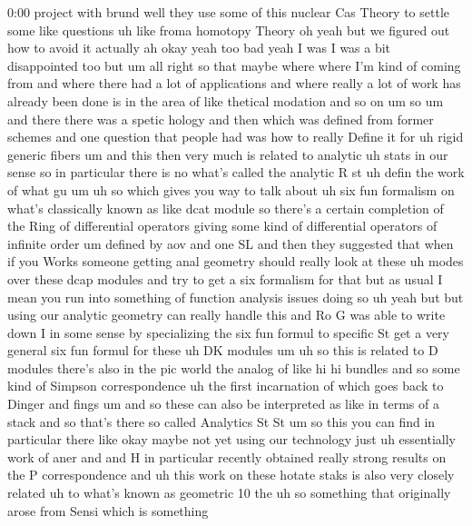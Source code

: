 \begin{unfinished}{0:00}
project  with  brund  well  they  use  some  of
this  nuclear  Cas  Theory  to  settle  some
like  questions  uh  like  froma  homotopy
Theory  oh  yeah  but  we  figured  out  how  to
avoid  it  actually  ah  okay  yeah  too
bad
yeah  I  was  I  was  a  bit  disappointed  too
but  um  all  right  so  that  maybe  where
where  I'm  kind  of  coming  from  and  where
there  had  a  lot  of  applications  and
where  really  a  lot  of  work  has  already
been  done  is  in  the  area  of  like
thetical  modation  and  so
on
um
so  um
and  there  there  was  a  spetic  hology  and
then  which  was  defined  from  former
schemes  and  one  question  that  people  had
was  how  to  really  Define  it  for  uh  rigid
generic  fibers  um  and  this  then  very
much  is  related  to  analytic  uh
stats  in  our  sense  so  in  particular
there  is  no  what's  called  the  analytic  R
st  uh  defin  the  work  of  what  gu
um  uh  so  which  gives  you  way  to  talk
about  uh  six  fun  formalism  on  what's
classically  known  as  like  dcat  module  so
there's  a  certain  completion  of  the  Ring
of  differential  operators  giving  some
kind  of  differential  operators  of
infinite  order  um  defined  by  aov  and  one
SL  and
then  they  suggested  that  when  if  you
Works  someone  getting  anal  geometry
should  really  look  at  these  uh  modes
over  these  dcap  modules  and  try  to  get  a
six  formalism  for  that  but  as  usual  I
mean  you  run  into  something  of  function
analysis  issues  doing  so
uh  yeah  but  but  using  our  analytic
geometry  can  really  handle  this  and  Ro  G
was  able  to  write  down  I  in  some  sense
by  specializing  the  six  fun  formul  to
specific  St  get  a  very  general  six  fun
formul  for  these  uh  DK
modules
um  uh  so  this  is  related  to  D  modules
there's  also  in  the  pic  world  the  analog
of  like  hi  hi  bundles  and  so  some  kind
of  Simpson  correspondence  uh  the  first
incarnation  of  which  goes  back  to  Dinger
and
fings  um  and  so  these  can  also  be
interpreted  as  like  in  terms  of  a  stack
and  so  that's  there  so  called  Analytics
St
St
um  so  this  you  can  find  in  particular
there  like  okay  maybe  not  yet  using  our
technology  just  uh  essentially  work  of
aner
and  and  H  in  particular  recently
obtained  really  strong  results  on  the  P
correspondence
and  uh  this  work  on  these  hotate  staks
is  also  very  closely  related  uh  to
what's  known
as  geometric  10
the  uh  so  something  that  originally
arose  from  Sensi  which  is  something

\end{unfinished}
